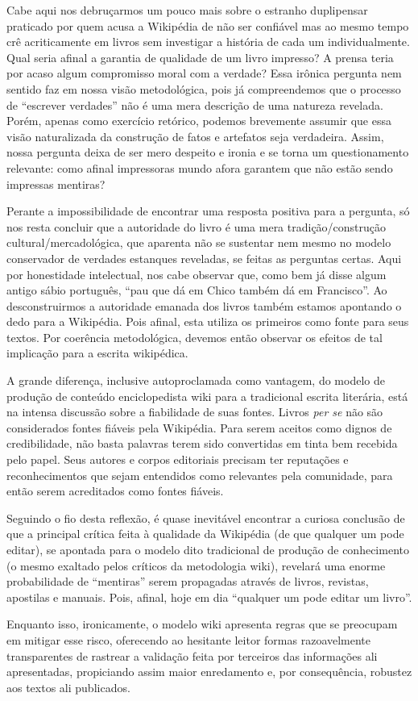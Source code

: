 Cabe aqui nos debruçarmos um pouco mais sobre o estranho duplipensar praticado por quem acusa a Wikipédia de não ser confiável mas ao mesmo tempo crê acriticamente em livros sem investigar a história de cada um individualmente. Qual seria afinal a garantia de qualidade de um livro impresso? A prensa teria por acaso algum compromisso moral com a verdade? Essa irônica pergunta nem sentido faz em nossa visão metodológica, pois já compreendemos que o processo de ``escrever verdades'' não é uma mera descrição de uma natureza revelada. Porém, apenas como exercício retórico, podemos brevemente assumir que essa visão naturalizada da construção de fatos e artefatos seja verdadeira. Assim, nossa pergunta deixa de ser mero despeito e ironia e se torna um questionamento relevante: como afinal impressoras mundo afora garantem que não estão sendo impressas mentiras? 

Perante a impossibilidade de encontrar uma resposta positiva para a pergunta, só nos resta concluir que a autoridade do livro é uma mera tradição/construção cultural/mercadológica, que aparenta não se sustentar nem mesmo no modelo conservador de verdades estanques reveladas, se feitas as perguntas certas. Aqui por honestidade intelectual, nos cabe observar que, como bem já disse algum antigo sábio português, ``pau que dá em Chico também dá em Francisco''. Ao desconstruirmos a autoridade emanada dos livros também estamos apontando o dedo para a Wikipédia. Pois afinal, esta utiliza os primeiros como fonte para seus textos. Por coerência metodológica, devemos então observar os efeitos de tal implicação para a escrita wikipédica. 

A grande diferença, inclusive autoproclamada como vantagem, do modelo de produção de conteúdo enciclopedista wiki para a tradicional escrita literária, está na intensa discussão sobre a fiabilidade de suas fontes. Livros \textit{per se} não são considerados fontes fiáveis pela Wikipédia. Para serem aceitos como dignos de credibilidade, não basta palavras terem sido convertidas em tinta bem recebida pelo papel. Seus autores e corpos editoriais precisam ter reputações e reconhecimentos que sejam entendidos como relevantes pela comunidade, para então serem acreditados como fontes fiáveis.

Seguindo o fio desta reflexão, é quase inevitável encontrar a curiosa conclusão de que a principal crítica feita à qualidade da Wikipédia (de que qualquer um pode editar), se apontada para o modelo dito tradicional de produção de conhecimento (o mesmo exaltado pelos críticos da metodologia wiki), revelará uma enorme probabilidade de ``mentiras'' serem propagadas através de livros, revistas, apostilas e manuais. Pois, afinal, hoje em dia ``qualquer um pode editar um livro''.

Enquanto isso, ironicamente, o modelo wiki apresenta regras que se preocupam em mitigar esse risco, oferecendo ao hesitante leitor formas razoavelmente transparentes de rastrear a validação feita por terceiros das informações ali apresentadas, propiciando assim maior enredamento e, por consequência, robustez aos textos ali publicados.